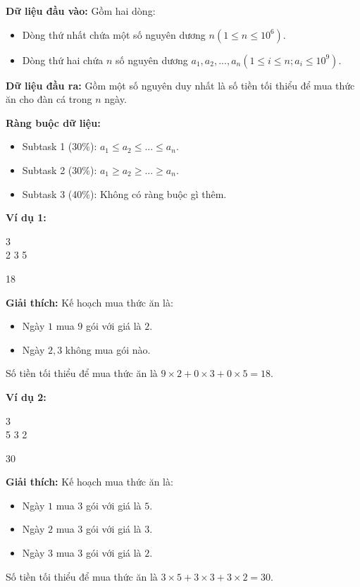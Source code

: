 \documentclass[12pt]{scrartcl}  %
\begin{document}
\textbf{Dữ liệu đầu vào:}
Gồm hai dòng:
\begin{itemize}
    \item Dòng thứ nhất chứa một số nguyên dương $n (1 \leq n \leq 10^6)$.
    \item Dòng thứ hai chứa $n$ số nguyên dương $a_1, a_2, ..., a_n (1 \leq i \leq n; a_i \leq 10^9)$.
\end{itemize}

\textbf{Dữ liệu đầu ra:}
Gồm một số nguyên duy nhất là số tiền tối thiểu để mua thức ăn cho đàn cá trong $n$ ngày.

\textbf{Ràng buộc dữ liệu:}
\begin{itemize}
    \item Subtask 1 (30\%): $a_1 \leq a_2 \leq ... \leq a_n$.
    \item Subtask 2 (30\%): $a_1 \geq a_2 \geq ... \geq a_n$.
    \item Subtask 3 (40\%): Không có ràng buộc gì thêm.
\end{itemize}


\textbf{Ví dụ 1:}
\begin{tcolorbox}[colback=gray!5!white, colframe=blue!50!black, title=Input]
3\\
2 3 5
\end{tcolorbox}
\begin{tcolorbox}[colback=gray!5!white, colframe=green!50!black, title=Output]
18
\end{tcolorbox}

\textbf{Giải thích:}
Kế hoạch mua thức ăn là:
\begin{itemize}
    \item Ngày $1$ mua $9$ gói với giá là $2$.
    \item Ngày $2, 3$ không mua gói nào.
\end{itemize}
Số tiền tối thiểu để mua thức ăn là $9 \times 2 + 0 \times 3 + 0 \times 5 = 18$.

\textbf{Ví dụ 2:}
\begin{tcolorbox}[colback=gray!5!white, colframe=blue!50!black, title=Input]
3\\
5 3 2
\end{tcolorbox}
\begin{tcolorbox}[colback=gray!5!white, colframe=green!50!black, title=Output]
30
\end{tcolorbox}

\textbf{Giải thích:}
Kế hoạch mua thức ăn là:
\begin{itemize}
    \item Ngày $1$ mua $3$ gói với giá là $5$.
    \item Ngày $2$ mua $3$ gói với giá là $3$.
    \item Ngày $3$ mua $3$ gói với giá là $2$.
\end{itemize}
Số tiền tối thiểu để mua thức ăn là $3 \times 5 + 3 \times 3 + 3 \times 2 = 30$.
\end{document}
